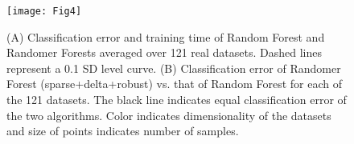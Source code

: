 \documentclass{article} %
\begin{document}
\begin{figure}[h]
\begin{center}
\texttt{[image: Fig4]}
\end{center}
\caption{(A) Classification error and training time of Random Forest and Randomer Forests averaged over 121 real datasets. Dashed lines represent a 0.1 SD level curve. (B) Classification error of Randomer Forest (sparse+delta+robust) vs. that of Random Forest for each of the 121 datasets. The black line indicates equal classification error of the two algorithms. Color indicates dimensionality of the datasets and size of points indicates number of samples.}
\end{figure}
\end{document}
